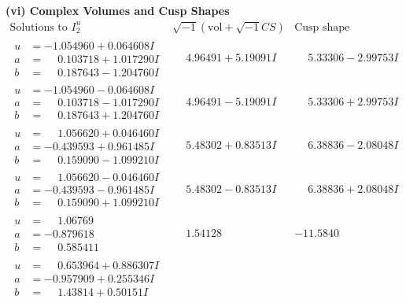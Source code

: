 \documentclass[1p]{elsarticle_modified}
\theoremstyle{definition}
\newcommand{\I}{\sqrt{-1}}
\begin{document}
\newpage\flushleft \textbf{(vi) Complex Volumes and Cusp Shapes}
$$\begin{array}{c|c|c}  
\text{Solutions to }I^u_{2}& \I (\text{vol} + \sqrt{-1}CS) & \text{Cusp shape}\\
 \hline 
\begin{aligned}
u &= -1.054960 + 0.064608 I \\
a &= \phantom{-}0.103718 + 1.017290 I \\
b &= \phantom{-}0.187643 - 1.204760 I\end{aligned}
 & \phantom{-}4.96491 + 5.19091 I & \phantom{-}5.33306 - 2.99753 I \\ \hline\begin{aligned}
u &= -1.054960 - 0.064608 I \\
a &= \phantom{-}0.103718 - 1.017290 I \\
b &= \phantom{-}0.187643 + 1.204760 I\end{aligned}
 & \phantom{-}4.96491 - 5.19091 I & \phantom{-}5.33306 + 2.99753 I \\ \hline\begin{aligned}
u &= \phantom{-}1.056620 + 0.046460 I \\
a &= -0.439593 + 0.961485 I \\
b &= \phantom{-}0.159090 - 1.099210 I\end{aligned}
 & \phantom{-}5.48302 + 0.83513 I & \phantom{-}6.38836 - 2.08048 I \\ \hline\begin{aligned}
u &= \phantom{-}1.056620 - 0.046460 I \\
a &= -0.439593 - 0.961485 I \\
b &= \phantom{-}0.159090 + 1.099210 I\end{aligned}
 & \phantom{-}5.48302 - 0.83513 I & \phantom{-}6.38836 + 2.08048 I \\ \hline\begin{aligned}
u &= \phantom{-}1.06769\phantom{ +0.000000I} \\
a &= -0.879618\phantom{ +0.000000I} \\
b &= \phantom{-}0.585411\phantom{ +0.000000I}\end{aligned}
 & \phantom{-}1.54128\phantom{ +0.000000I} & -11.5840\phantom{ +0.000000I} \\ \hline\begin{aligned}
u &= \phantom{-}0.653964 + 0.886307 I \\
a &= -0.957909 + 0.255346 I \\
b &= \phantom{-}1.43814 + 0.50151 I\end{aligned}

\end{array}$$
\end{document}
